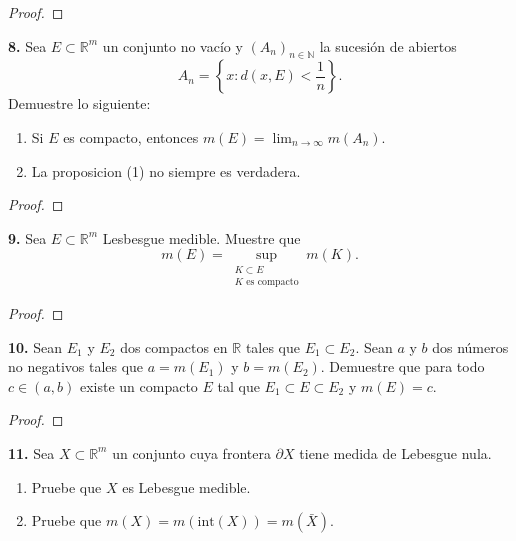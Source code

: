 \documentclass{article}
\newenvironment{statement}[1]{\smallskip\noindent\color[rgb]{1.00,0.00,0.50} {\bf #1.}}{}
\theoremstyle{definition}
\theoremstyle{remark}
\newcommand{\BR}{\mathbb R}
\newcommand{\BN}{\mathbb N}
\begin{document}
\begin{proof}
\end{proof}

\begin{statement}{8}
  Sea $E \subset \BR^m$ un conjunto no vac\'io y $(A_n)_{n \in \BN}$ la
  sucesi\'on de abiertos
  \[
    A_n = \left\{x : d(x, E) < \frac{1}{n}\right\}.
  \]
  Demuestre lo siguiente:
  \begin{enumerate}
    \item Si $E$ es compacto, entonces $m(E) = \lim_{n \to \infty} m(A_n)$.
    \item La proposicion (1) no siempre es verdadera.
  \end{enumerate}
\end{statement}

\begin{proof}
\end{proof}

\begin{statement}{9}
  Sea $E \subset \BR^m$ Lesbesgue medible. Muestre que
  \[
    m(E) = \sup_{\substack{K \subset E \\ K \text{ es compacto}}}  m(K).
  \]
\end{statement}

\begin{proof}
\end{proof}

\begin{statement}{10}
  Sean $E_1$ y $E_2$ dos compactos en $\BR$ tales que $E_1 \subset E_2$.
  Sean $a$ y $b$ dos n\'umeros no negativos tales que
  $a = m(E_1)$ y $b = m(E_2)$. Demuestre que para todo $c \in (a, b)$ existe
  un compacto $E$ tal que $E_1 \subset E \subset E_2$ y $m(E) = c$.
\end{statement}

\begin{proof}
\end{proof}

\begin{statement}{11}
  Sea $X \subset \BR^m$ un conjunto cuya frontera $\partial X$ tiene
  medida de Lebesgue nula.
  \begin{enumerate}
    \item Pruebe que $X$ es Lebesgue medible.
    \item Pruebe que $m(X) = m(\text{int}(X)) = m(\bar{X})$.
  \end{enumerate}
\end{statement}
\end{document}
